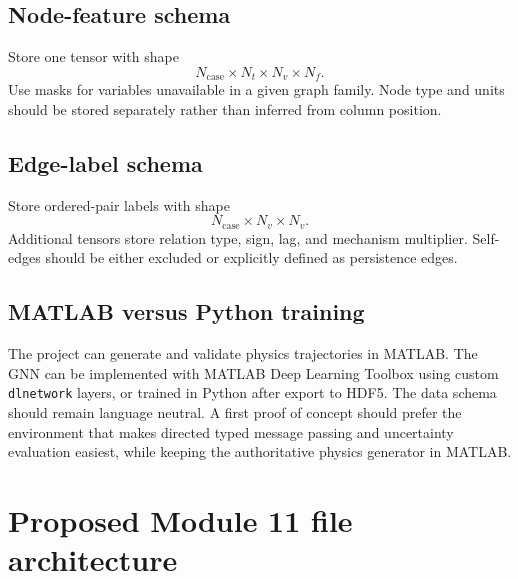 \documentclass[11pt]{article}
\begin{document}
\subsection{Node-feature schema}

Store one tensor with shape
\begin{equation}
N_{\mathrm{case}}\times N_t\times N_v\times N_f.
\end{equation}
Use masks for variables unavailable in a given graph family. Node type and units should be stored separately rather than inferred from column position.

\subsection{Edge-label schema}

Store ordered-pair labels with shape
\begin{equation}
N_{\mathrm{case}}\times N_v\times N_v.
\end{equation}
Additional tensors store relation type, sign, lag, and mechanism multiplier. Self-edges should be either excluded or explicitly defined as persistence edges.

\subsection{MATLAB versus Python training}

The project can generate and validate physics trajectories in MATLAB. The GNN can be implemented with MATLAB Deep Learning Toolbox using custom \texttt{dlnetwork} layers, or trained in Python after export to HDF5. The data schema should remain language neutral. A first proof of concept should prefer the environment that makes directed typed message passing and uncertainty evaluation easiest, while keeping the authoritative physics generator in MATLAB.

\section{Proposed Module 11 file architecture}
\end{document}

